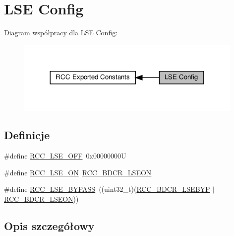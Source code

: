 \hypertarget{group___r_c_c___l_s_e___config}{}\section{L\+SE Config}
\label{group___r_c_c___l_s_e___config}
Diagram współpracy dla L\+SE Config\+:\nopagebreak
\begin{figure}[H]
\begin{center}
\leavevmode
\includegraphics[width=312pt]{group___r_c_c___l_s_e___config}
\end{center}
\end{figure}
\subsection*{Definicje}
\begin{DoxyCompactItemize}
\item 
\#define \hyperlink{group___r_c_c___l_s_e___config_ga6645c27708d0cad1a4ab61d2abb24c77}{R\+C\+C\+\_\+\+L\+S\+E\+\_\+\+O\+FF}~0x00000000U
\item 
\#define \hyperlink{group___r_c_c___l_s_e___config_gac981ea636c2f215e4473901e0912f55a}{R\+C\+C\+\_\+\+L\+S\+E\+\_\+\+ON}~\hyperlink{group___peripheral___registers___bits___definition_ga00145f8814cb9a5b180d76499d97aead}{R\+C\+C\+\_\+\+B\+D\+C\+R\+\_\+\+L\+S\+E\+ON}
\item 
\#define \hyperlink{group___r_c_c___l_s_e___config_gaad580157edbae878edbcc83c5a68e767}{R\+C\+C\+\_\+\+L\+S\+E\+\_\+\+B\+Y\+P\+A\+SS}~((uint32\+\_\+t)(\hyperlink{group___peripheral___registers___bits___definition_ga542dffd7f8dc4da5401b54d822a22af0}{R\+C\+C\+\_\+\+B\+D\+C\+R\+\_\+\+L\+S\+E\+B\+YP} $\vert$ \hyperlink{group___peripheral___registers___bits___definition_ga00145f8814cb9a5b180d76499d97aead}{R\+C\+C\+\_\+\+B\+D\+C\+R\+\_\+\+L\+S\+E\+ON}))
\end{DoxyCompactItemize}


\subsection{Opis szczegółowy}


